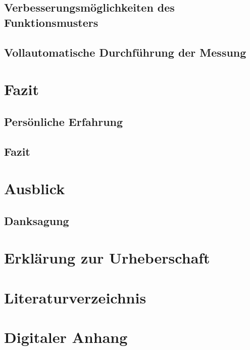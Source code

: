 \documentclass[a4paper,12pt]{article}
\begin{document}
\subsection{Verbesserungsmöglichkeiten des Funktionsmusters}

\newpage
\subsection{Vollautomatische Durchführung der Messung}


\newpage
\section{Fazit}
%

\subsection{Persönliche Erfahrung}


\subsection{Fazit}


\section{Ausblick}

\newpage
\subsection*{Danksagung}


\newpage
%


\newpage
\section*{Erklärung zur Urheberschaft}


\newpage
\section*{Literaturverzeichnis}


\newpage
\listoffigures


\newpage
\section*{Digitaler Anhang}
\end{document}
